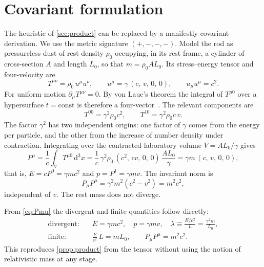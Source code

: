 \documentclass[11pt,a4paper]{article}
\theoremstyle{definition}
\theoremstyle{remark}
\newcommand{\dd}{\mathrm{d}}
\begin{document}
\section{Covariant formulation}\label{sec:covariant}

The heuristic of \cref{sec:product} can be replaced by a manifestly covariant
derivation. We use the metric signature $(+,-,-,-)$. Model the rod as
pressureless dust of rest density $\rho_0$ occupying, in its rest frame, a
cylinder of cross-section $A$ and length $L_0$, so that $m=\rho_0AL_0$. Its
stress--energy tensor and four-velocity are~\cite{MTW,Rindler}
\begin{equation}
  T^{\mu\nu}=\rho_0\,u^{\mu}u^{\nu},\qquad
  u^{\mu}=\gamma\,(c,\,v,\,0,\,0),\qquad u_\mu u^\mu=c^2 .
  \label{eq:Tmunu}
\end{equation}
For uniform motion $\partial_\mu T^{\mu\nu}=0$. By von Laue's theorem the
integral of $T^{\mu0}$ over a hypersurface $t=\text{const}$ is therefore a
four-vector~\cite{Rindler,Jackson}. The relevant components are
\begin{equation}
  T^{00}=\gamma^{2}\rho_0c^{2},\qquad T^{10}=\gamma^{2}\rho_0c\,v .
  \label{eq:components}
\end{equation}
The factor $\gamma^2$ has two independent origins: one factor of $\gamma$
comes from the energy per particle, and the other from the increase of number
density under contraction. Integrating over the contracted laboratory volume
$V=AL_0/\gamma$ gives
\begin{equation}
  P^{\mu}=\frac1c\int_V T^{\mu0}\,\dd^3x
  =\frac1c\,\gamma^{2}\rho_0\,(c^2,\,cv,\,0,\,0)\,\frac{AL_0}{\gamma}
  =\gamma m\,(c,\,v,\,0,\,0),
  \label{eq:Pmu}
\end{equation}
that is, $E=cP^0=\gamma mc^2$ and $p=P^1=\gamma mv$. The invariant norm is
\begin{equation}
  P_\mu P^\mu=\gamma^{2}m^{2}(c^{2}-v^{2})=m^{2}c^{2},
  \label{eq:norm}
\end{equation}
independent of $v$. The rest mass does not diverge.

From \cref{eq:Pmu} the divergent and finite quantities follow directly:
\begin{align}
  \text{divergent:}&\quad E=\gamma mc^2,\quad p=\gamma mv,\quad
    \lambda\equiv\frac{E/c^2}{L}=\frac{\gamma^{2}m}{L_0}, \label{eq:div}\\
  \text{finite:}&\quad \frac{E}{c^2}\,L=mL_0,\qquad P_\mu P^\mu=m^2c^2 .
  \label{eq:fin}
\end{align}
This reproduces \cref{prop:product} from the tensor without using the notion
of relativistic mass at any stage.
\end{document}
